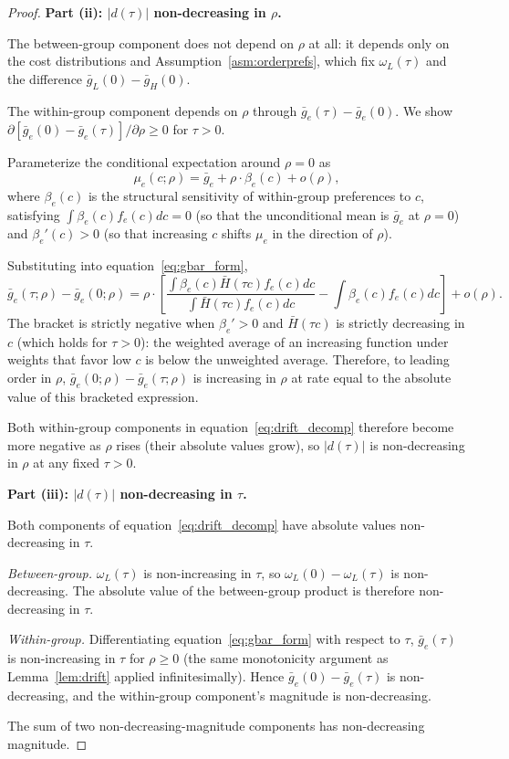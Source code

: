 \begin{proof}
\textbf{Part (ii): $|d(\tau)|$ non-decreasing in $\rho$.}

The between-group component does not depend on $\rho$ at all: it depends only on the cost distributions and Assumption~\ref{asm:orderprefs}, which fix $\omega_L(\tau)$ and the difference $\bar g_L(0) - \bar g_H(0)$.

The within-group component depends on $\rho$ through $\bar g_e(\tau) - \bar g_e(0)$. We show $\partial[\bar g_e(0) - \bar g_e(\tau)]/\partial \rho \geq 0$ for $\tau > 0$.

Parameterize the conditional expectation around $\rho = 0$ as
\[
\mu_e(c; \rho) = \bar g_e + \rho \cdot \beta_e(c) + o(\rho),
\]
where $\beta_e(c)$ is the structural sensitivity of within-group preferences to $c$, satisfying $\int \beta_e(c) f_e(c) dc = 0$ (so that the unconditional mean is $\bar g_e$ at $\rho = 0$) and $\beta_e'(c) > 0$ (so that increasing $c$ shifts $\mu_e$ in the direction of $\rho$).

Substituting into equation~\eqref{eq:gbar_form},
\[
\bar g_e(\tau; \rho) - \bar g_e(0; \rho) = \rho \cdot \left[ \frac{\int \beta_e(c) \bar H(\tau c) f_e(c) dc}{\int \bar H(\tau c) f_e(c) dc} - \int \beta_e(c) f_e(c) dc \right] + o(\rho).
\]
The bracket is strictly negative when $\beta_e' > 0$ and $\bar H(\tau c)$ is strictly decreasing in $c$ (which holds for $\tau > 0$): the weighted average of an increasing function under weights that favor low $c$ is below the unweighted average. Therefore, to leading order in $\rho$, $\bar g_e(0; \rho) - \bar g_e(\tau; \rho)$ is increasing in $\rho$ at rate equal to the absolute value of this bracketed expression.

Both within-group components in equation~\eqref{eq:drift_decomp} therefore become more negative as $\rho$ rises (their absolute values grow), so $|d(\tau)|$ is non-decreasing in $\rho$ at any fixed $\tau > 0$.

\textbf{Part (iii): $|d(\tau)|$ non-decreasing in $\tau$.}

Both components of equation~\eqref{eq:drift_decomp} have absolute values non-decreasing in $\tau$.

\emph{Between-group.} $\omega_L(\tau)$ is non-increasing in $\tau$, so $\omega_L(0) - \omega_L(\tau)$ is non-decreasing. The absolute value of the between-group product is therefore non-decreasing in $\tau$.

\emph{Within-group.} Differentiating equation~\eqref{eq:gbar_form} with respect to $\tau$, $\bar g_e(\tau)$ is non-increasing in $\tau$ for $\rho \geq 0$ (the same monotonicity argument as Lemma~\ref{lem:drift} applied infinitesimally). Hence $\bar g_e(0) - \bar g_e(\tau)$ is non-decreasing, and the within-group component's magnitude is non-decreasing.

The sum of two non-decreasing-magnitude components has non-decreasing magnitude.
\end{proof}

